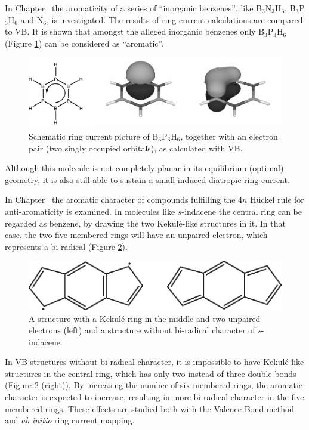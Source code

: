 In Chapter \chinorganic\ the aromaticity of a series of ``inorganic benzenes'', like B$_3$N$_3$H$_6$, B$_3$P$_3$H$_6$ and N$_6$, is investigated. The results of ring current calculations are compared to VB. It is shown that amongst the alleged inorganic benzenes only B$_3$P$_3$H$_6$ (Figure \ref{ch1.fig.b3p3h6}) can be considered as ``aromatic''.
 \begin{figure}[ht]
\center
\includegraphics[width=5in]{introduction/figures/b3p3h6.eps}
\caption{Schematic ring current picture of B$_3$P$_3$H$_6$, together with an electron pair (two singly occupied orbitals), as calculated with VB.}
\label{ch1.fig.b3p3h6}
\end{figure}
 Although this molecule is not completely planar in its equilibrium (optimal) geometry, it is also still able to sustain a small induced diatropic ring current. 

In Chapter \chindacene\ the aromatic character of compounds fulfilling the 4$n$ H\"{u}ckel rule for anti-aromaticity is examined. In molecules like $s$-indacene the central ring can be regarded as benzene, by drawing the two Kekul\'e-like structures in it. In that case, the two five membered rings will have an unpaired electron, which represents a bi-radical (Figure \ref{ch1.fig.indacene}). 
\begin{figure}[htdp]
\center
\includegraphics{introduction/figures/indacene.eps}
\caption{A structure with a Kekul\'e ring in the middle and two unpaired electrons (left) and a structure without bi-radical character of \textit{s}-indacene.}
\label{ch1.fig.indacene}
\end{figure}
In VB structures without bi-radical character, it is impossible to have Kekul\'e-like structures in the central ring, which has only two instead of three double bonds (Figure \ref{ch1.fig.indacene} (right)). By increasing the number of six membered rings, the aromatic character is expected to increase, resulting in more bi-radical character in the five membered rings. These effects are studied both with the Valence Bond method and \textit{ab initio} ring current mapping.  


 
